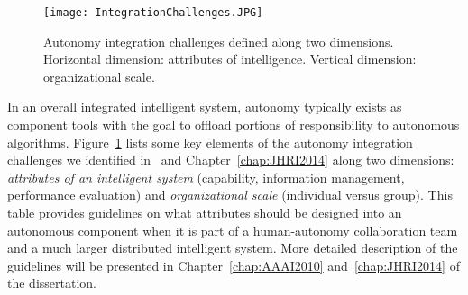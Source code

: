 

\begin{figure}
\centering
\texttt{[image: IntegrationChallenges.JPG]}
\caption{Autonomy integration challenges defined along two dimensions. Horizontal dimension: attributes of intelligence. Vertical dimension: organizational scale.}
\label{challenges}
\end{figure}

In an overall integrated intelligent system, autonomy typically exists as component tools with the goal to offload portions of responsibility to autonomous algorithms. Figure~\ref{challenges} lists some key elements of the autonomy integration challenges we identified in~\cite{Lin2010Supporting} and Chapter~\ref{chap:JHRI2014} along two dimensions: \textit{attributes of an intelligent system} (capability, information management, performance evaluation) and \textit{organizational scale} (individual versus group). This table provides guidelines on what attributes should be designed into an autonomous component when it is part of a human-autonomy collaboration team and a much larger distributed intelligent system. More detailed description of the guidelines will be presented in Chapter~\ref{chap:AAAI2010} and~\ref{chap:JHRI2014} of the dissertation.

